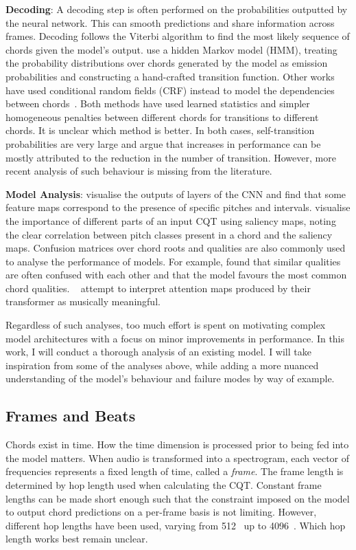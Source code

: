 \textbf{Decoding}: A decoding step is often performed on the probabilities outputted by the neural network. This can smooth predictions and share information across frames. Decoding follows the Viterbi algorithm to find the most likely sequence of chords given the model's output. \citet{BalanceRandomForestACR} use a hidden Markov model (HMM), treating the probability distributions over chords generated by the model as emission probabilities and constructing a hand-crafted transition function.  Other works have used conditional random fields (CRF) instead to model the dependencies between chords~\citep{ACRLargeVocab1}. Both methods have used learned statistics and simpler homogeneous penalties between different chords for transitions to different chords. It is unclear which method is better. In both cases, self-transition probabilities are very large and \citet{CommonVariations} argue that increases in performance can be mostly attributed to the reduction in the number of transition. However, more recent analysis of such behaviour is missing from the literature.

\textbf{Model Analysis}: \citet{FeatureMaps} visualise the outputs of layers of the CNN and find that some feature maps correspond to the presence of specific pitches and intervals. \citet{SaliencyChroma} visualise the importance of different parts of an input CQT using saliency maps, noting the clear correlation between pitch classes present in a chord and the saliency maps. Confusion matrices over chord roots and qualities are also commonly used to analyse the performance of models. For example, \citet{StructuredTraining} found that similar qualities are often confused with each other and that the model favours the most common chord qualities. ~\citet{BTC} attempt to interpret attention maps produced by their transformer as musically meaningful.

Regardless of such analyses, too much effort is spent on motivating complex model architectures with a focus on minor improvements in performance. In this work, I will conduct a thorough analysis of an existing model. I will take inspiration from some of the analyses above, while adding a more nuanced understanding of the model's behaviour and failure modes by way of example.

\subsection{Frames and Beats}

Chords exist in time. How the time dimension is processed prior to being fed into the model matters. When audio is  transformed into a spectrogram, each vector of frequencies represents a fixed length of time, called a \emph{frame}. The frame length is determined by hop length used when calculating the CQT. Constant frame lengths can be made short enough such that the constraint imposed on the model to output chord predictions on a per-frame basis is not limiting. However, different hop lengths have been used, varying from 512~\cite{ACRLargeVocab1} up to 4096~\citep{StructuredTraining}. Which hop length works best remain unclear.

